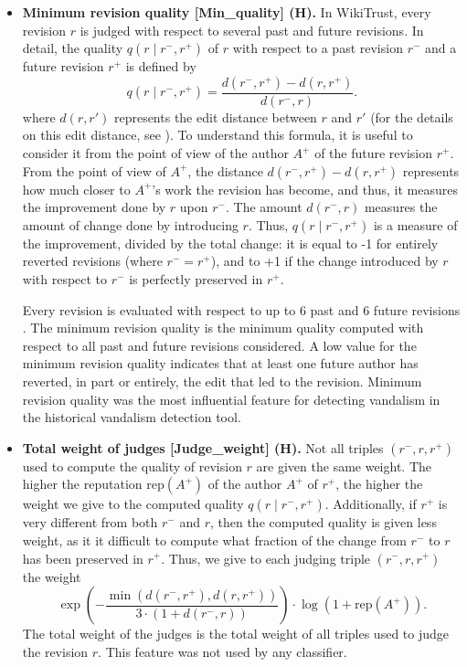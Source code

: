 \begin{itemize}
\item {\bf Minimum revision quality [Min\_quality] (H).}  In WikiTrust, every revision $r$ is judged with respect to several past and future revisions.  
In detail, the quality $q(r \mid r^{-}, r^{+})$ of $r$ with respect to a past revision $r^{-}$ and a future revision $r^{+}$ is defined by 
\[
  q(r \mid r^{-}, r^{+}) = \frac{d(r^{-}, r^{+}) - d(r, r^{+})}{d(r^{-}, r)}. 
\]
where $d(r,r')$ represents the edit distance between $r$ and $r'$ (for the details on this edit distance, see \cite{www07}).
To understand this formula, it is useful to consider it from the point of view of the author $A^{+}$ of the future revision $r^{+}$.
From the point of view of $A^{+}$, the distance $d(r^{-}, r^{+}) - d(r, r^{+})$ represents how much closer to $A^{+}$'s work the revision has become, and thus, it measures the improvement done by $r$ upon $r^{-}$.
The amount $d(r^{-}, r)$ measures the amount of change done by introducing $r$.  
Thus, $q(r \mid r^{-}, r^{+})$ is a measure of the improvement, divided by the total change: it is equal to -1 for entirely reverted revisions (where $r^{-} = r^{+}$), and to +1 if the change introduced by $r$ with respect to $r^-$ is perfectly preserved in $r^{+}$. 

Every revision is evaluated with respect to up to 6 past and 6 future revisions \cite{AIsec08}.
The minimum revision quality is the minimum quality computed with respect to all past and future revisions considered. 
A low value for the minimum revision quality indicates that at least one future author has reverted, in part or entirely, the edit that led to the revision. 
Minimum revision quality was the most influential feature for detecting vandalism in the historical vandalism detection tool. 

\item {\bf Total weight of judges [Judge\_weight] (H).} 
Not all triples $(r^{-}, r, r^{+})$ used to compute the quality of revision $r$ are given the same weight.  The higher the reputation ${\textrm{rep}}(A^{+})$  of the author $A^{+}$ of $r^{+}$, the higher the weight we give to the computed quality $q(r \mid r^{-}, r^{+})$. 
Additionally, if $r^{+}$ is very different from both $r^{-}$ and $r$, then the computed quality is given less weight, as it it difficult to compute what fraction of the change from $r^{-}$ to $r$ has been preserved in $r^{+}$. 
Thus, we give to each judging triple $(r^{-}, r, r^{+})$ the weight 
\[
\exp \left( -
\frac{\min(d(r^{-}, r^{+}), d(r, r^{+}))}{3 \cdot (1 + d(r^{-}, r))} \right)
\cdot \log(1 + {\textrm{rep}}(A^{+})).
\]
The total weight of the judges is the total weight of all triples used to judge the revision $r$. 
This feature was not used by any classifier. 


\end{itemize}
